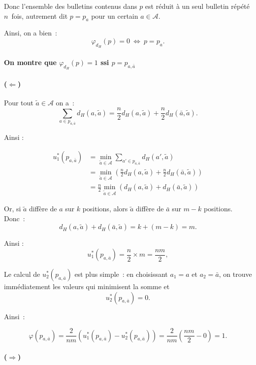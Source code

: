 \documentclass[11pt]{article}
\begin{document}
Donc l’ensemble des bulletins contenus dans $p$ est réduit à un seul bulletin répété $n$ fois,  
autrement dit $p = p_a$ pour un certain $a \in \mathcal{A}$.


Ainsi, on a bien :
\[
\varphi_{d_H}(p) = 0 \ \Leftrightarrow\  p = p_a.
\]
\\	

\textbf{On montre que $\varphi_{d_H}(p) = 1$ ssi $p = p_{a, \bar{a}}$}

\paragraph{($\Leftarrow$)}  
Pour tout $\tilde{a} \in \mathcal{A}$ on a~: 
\[
\sum_{a \in p_{a,\bar{a}}} d_H(a,\tilde{a}) 
= \frac{n}{2} d_H(a,\tilde{a}) + \frac{n}{2} d_H(\bar{a}, \tilde{a}).
\]


Ainsi :

\begin{align*}
u_1^*(p_{a,\bar{a}}) 
&=
\min_{\tilde{a} \in \mathcal{A}} 
\sum_{a' \in p_{a,\bar{a}}} d_H(a', \tilde{a})\\
&=
\min_{\tilde{a} \in \mathcal{A}} 
\left(\frac{n}{2} d_H(a, \tilde{a}) + \frac{n}{2} d_H(\bar{a}, \tilde{a})\right)\\
&=
\frac{n}{2} \min_{\tilde{a} \in \mathcal{A}} \left( d_H(a, \tilde{a}) + d_H(\bar{a}, \tilde{a}) \right)
\end{align*}

Or, si $\tilde{a}$ diffère de $a$ sur $k$ positions, alors $\tilde{a}$ diffère de $\bar{a}$ sur $m - k$ positions. Donc~:
\[
d_H(a, \tilde{a}) + d_H(\bar{a}, \tilde{a}) = k + (m - k) = m.
\]

Ainsi :
\[
u_1^*(p_{a,\bar{a}}) = \frac{n}{2} \times m = \frac{n m}{2},
\]

Le calcul de $u_2^*(p_{a,\bar{a}})$ est plus simple~: en choisissant $a_1 = a$ et $a_2 = \bar{a}$, on trouve immédiatement les valeurs qui minimisent la somme et 
\[
u_2^*(p_{a,\bar{a}}) = 0.
\]

Ainsi~:

\[
\varphi(p_{a,\bar{a}}) 
= 
\frac{2}{nm} \left(u_1^*(p_{a,\bar{a}}) - u_2^*(p_{a,\bar{a}}) \right) 
= 
\frac{2}{nm} \left(\frac{nm}{2} - 0 \right) 
=
1.
\]

\paragraph{($\Rightarrow$)}
\end{document}
